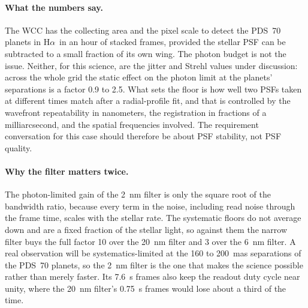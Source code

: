\documentclass[11pt]{article}
\newcommand{\Ha}{H$\alpha$}
\begin{document}
\paragraph{What the numbers say.} The WCC has the collecting area and the pixel scale to detect the PDS~70 planets in \Ha\ in an hour of stacked frames, provided the stellar PSF can be subtracted to a small fraction of its own wing. The photon budget is not the issue. Neither, for this science, are the jitter and Strehl values under discussion: across the whole grid the static effect on the photon limit at the planets' separations is a factor 0.9 to 2.5. What sets the floor is how well two PSFs taken at different times match after a radial-profile fit, and that is controlled by the wavefront repeatability in nanometers, the registration in fractions of a milliarcsecond, and the spatial frequencies involved. The requirement conversation for this case should therefore be about PSF stability, not PSF quality.

\paragraph{Why the filter matters twice.} The photon-limited gain of the 2~nm filter is only the square root of the bandwidth ratio, because every term in the noise, including read noise through the frame time, scales with the stellar rate. The systematic floors do not average down and are a fixed fraction of the stellar light, so against them the narrow filter buys the full factor 10 over the 20~nm filter and 3 over the 6~nm filter. A real observation will be systematics-limited at the 160 to 200~mas separations of the PDS~70 planets, so the 2~nm filter is the one that makes the science possible rather than merely faster. Its 7.6~s frames also keep the readout duty cycle near unity, where the 20~nm filter's 0.75~s frames would lose about a third of the time.
\end{document}

